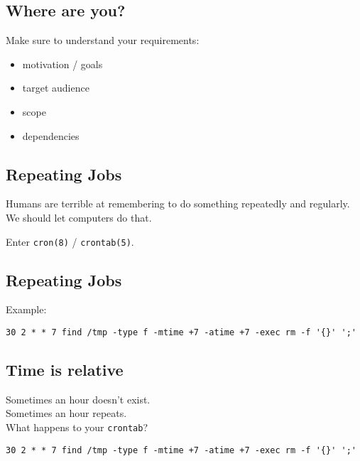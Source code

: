 \documentclass[xga]{xdvislides}
\begin{document}
\subsection{Where are you?}
Make sure to understand your requirements:

\begin{itemize}
	\item motivation / goals
	\item target audience
	\item scope
	\item dependencies
\end{itemize}



\subsection{Repeating Jobs}
Humans are terrible at remembering to do something repeatedly and
regularly.  We should let computers do that. \\

\vspace{.5in}

Enter \verb+cron(8)+ / \verb+crontab(5)+.

\subsection{Repeating Jobs}
Example: \\
\vspace{.5in}

\begin{verbatim}
30 2 * * 7 find /tmp -type f -mtime +7 -atime +7 -exec rm -f '{}' ';'
\end{verbatim}

\subsection{Time is relative}
Sometimes an hour doesn't exist. \\

\vspace{.5in}
Sometimes an hour repeats. \\

\vspace{.5in}
What happens to your \verb+crontab+?
\begin{verbatim}
30 2 * * 7 find /tmp -type f -mtime +7 -atime +7 -exec rm -f '{}' ';'
\end{verbatim}
\end{document}
